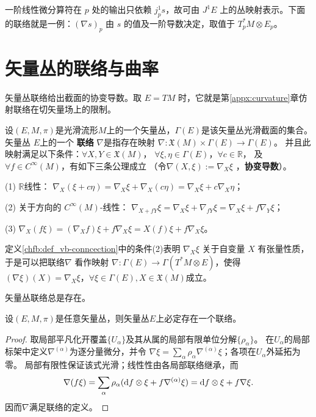 一阶线性微分算符在 $p$ 处的输出只依赖 $j_p^1s$，故可由 $J^1E$ 上的丛映射表示。下面的联络就是一例：$(\nabla s)_p$ 由 $s$ 的值及一阶导数决定，取值于 $T_p^*M\otimes E_p$。

\section{矢量丛的联络与曲率}

矢量丛联络给出截面的协变导数。取 $E=TM$ 时，它就是第\ref{appx:curvature}章仿射联络在切矢量场上的限制。

\begin{definition}\label{chfb:def_vb-conncection}
    设$(E,M,\pi)$是光滑流形$M$上的一个矢量丛，$\Gamma(E)$是该矢量丛光滑截面的集合。
    矢量丛 $E$上的一个 \textbf{联络} $\nabla$是指存在映射
    $\nabla: \mathfrak{X}(M) \times \Gamma(E) \rightarrow \Gamma(E)$。
    并且此映射满足以下条件：$\forall X, Y \in \mathfrak{X}(M)$，
    $\forall \xi, \eta \in \Gamma(E)$，$\forall c \in \mathbb{R}$，
    及 $\forall f \in C^{\infty}(M)$，有如下三条公理成立
    （令$\nabla(X, \xi) := \nabla_X \xi$ ，\textbf{协变导数}）。

    (1) $\mathbb{R}$线性： $\nabla_X(\xi+c \eta) =
     \nabla_X \xi+\nabla_X (c\eta) =  \nabla_X \xi+c \nabla_X \eta$；

    (2) 关于方向的 $C^\infty(M)$-线性： $\nabla_{X+f Y} \xi =
    \nabla_X \xi+ \nabla_{fY} \xi = \nabla_X \xi+f \nabla_Y \xi$；

    (3) $\nabla_X(f \xi) = (\nabla_X f) \xi+f \nabla_X \xi
     = X(f) \xi+f \nabla_X \xi$。
\end{definition}

定义\ref{chfb:def_vb-conncection}中的条件(2)表明 $\nabla_X \xi$ 关于自变量 $X$ 有张量性质，
于是可以把联络$\nabla$ 看作映射 $\nabla: \Gamma(E) \rightarrow \Gamma (T^* M \otimes E )$，使得
$(\nabla \xi)(X)=\nabla_X \xi$，$ \forall \xi \in \Gamma(E), X \in \mathfrak{X}(M) $成立。

矢量丛联络总是存在。

\begin{theorem}
    设$(E,M,\pi)$是任意矢量丛，则矢量丛$E$上必定存在一个联络。
\end{theorem}
\begin{proof}
    取局部平凡化开覆盖$\{U_\alpha\}$及其从属的局部有限单位分解$\{\rho_\alpha\}$。
    在$U_\alpha$的局部标架中定义$\nabla^{(\alpha)}$为逐分量微分，并令
    $\nabla\xi=\sum_\alpha\rho_\alpha\nabla^{(\alpha)}\xi$；各项在$U_\alpha$外延拓为零。
    局部有限性保证该式光滑；线性性由各局部联络继承，而
    \[
        \nabla(f\xi)=\sum_\alpha\rho_\alpha
        (\dd f\otimes\xi+f\nabla^{(\alpha)}\xi)
        =\dd f\otimes\xi+f\nabla\xi .
    \]
    因而$\nabla$满足联络的定义。
\end{proof}

